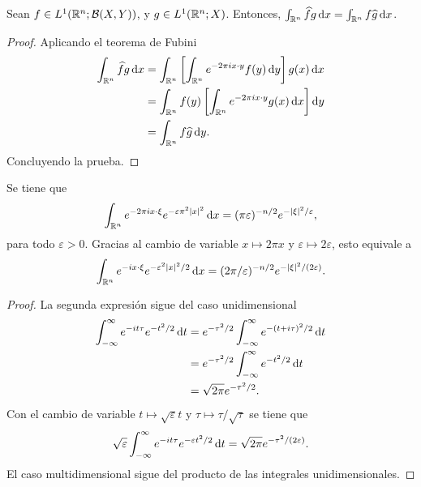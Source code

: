 \begin{lemma}
    Sean $f\in L^1(\mathbb{R}^n;\mathcal{B}(X, Y))$, y $g \in L^1(\mathbb{R}^n;X)$. Entonces, $\int_{\mathbb{R}^n}\widehat{f} g \mathop{}\!\mathrm{d} x 
    = \int_{\mathbb{R}^n} f \widehat{g} \mathop{}\!\mathrm{d} x$.
\end{lemma}
\begin{proof}
    Aplicando el teorema de Fubini 
    \begin{align*}
        \int_{\mathbb{R}^n}\widehat{f} g \mathop{}\!\mathrm{d} x & = \int_{\mathbb{R}^n} \left[
            \int_{\mathbb{R}^n} e^{-2\pi i x\cdot y} f(y) \mathop{}\!\mathrm{d} y
        \right] g(x) \mathop{}\!\mathrm{d} x \\
        & = \int_{\mathbb{R}^n} f(y)\left[
            \int_{\mathbb{R}^n} e^{-2\pi i x\cdot y} g(x) \mathop{}\!\mathrm{d} x
        \right] \mathop{}\!\mathrm{d} y \\ 
        & = \int_{\mathbb{R}^n} f \widehat{g} \mathop{}\!\mathrm{d} y.
    \end{align*}
    Concluyendo la prueba.
\end{proof}
\begin{lemma}
    Se tiene que
    \begin{equation*}
       \int_{\mathbb{R}^n} e^{-2\pi i x \cdot \xi} e^{-\varepsilon\pi^2|x|^2}
        \mathop{}\!\mathrm{d} x = (\pi\varepsilon)^{-n/2} e^{-|\xi|^2/\varepsilon},  
    \end{equation*}
    para todo $\varepsilon > 0$. Gracias al cambio de variable 
    $x \mapsto 2\pi x$ y $\varepsilon \mapsto 2\varepsilon$, esto equivale a
    \begin{equation*}
       \int_{\mathbb{R}^n} e^{- i x \cdot \xi} e^{-\varepsilon^2|x|^2/2}
        \mathop{}\!\mathrm{d} x = (2\pi/\varepsilon)^{-n/2} e^{-|\xi|^2/(2\varepsilon)}. 
    \end{equation*}
\end{lemma}
\begin{proof}
    La segunda expresión sigue del caso unidimensional
    \begin{align*}
        \int_{-\infty}^{\infty} e^{-it\tau}e^{-t^2/2} \mathop{}\!\mathrm{d} t & = 
        e^{-\tau^2/2} \int_{-\infty}^{\infty} e^{-(t+i\tau)^2/2} \mathop{}\!\mathrm{d} t \\
        & = e^{-\tau^2/2} \int_{-\infty}^{\infty} e^{-t^2/2} \mathop{}\!\mathrm{d} t \\
        & = \sqrt{2\pi} e^{-\tau^2/2}.
    \end{align*}
    Con el cambio de variable $t\mapsto\sqrt{\varepsilon}t$ y 
    $\tau\mapsto\tau/\sqrt{\tau}$ se tiene que 
    \begin{equation*}
        \sqrt{\varepsilon}\int_{-\infty}^{\infty} e^{-it\tau}e^{-\varepsilon t^2/2} 
        \mathop{}\!\mathrm{d} t = 
        \sqrt{2\pi} e^{-\tau^2/(2\varepsilon)}.
    \end{equation*}
    El caso multidimensional sigue del producto de las integrales unidimensionales.
\end{proof}
